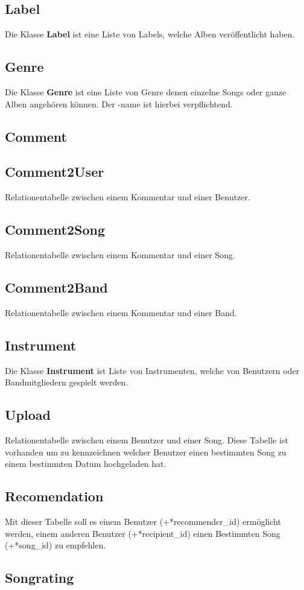 \documentclass[11pt,a4paper,DIV=9]{scrartcl}
\begin{document}
  \subsection{Label}
    Die Klasse \textbf{Label} ist eine Liste von Labels, welche Alben veröffentlicht haben.
  \subsection{Genre}
    Die Klasse \textbf{Genre} ist eine Liste von Genre denen einzelne Songs oder ganze Alben angehören können. Der -name ist hierbei verpflichtend.
  \subsection{Comment}
  \subsection{Comment2User}
    Relationentabelle zwischen einem Kommentar und einer Benutzer.
  \subsection{Comment2Song}
    Relationentabelle zwischen einem Kommentar und einer Song.
  \subsection{Comment2Band}
    Relationentabelle zwischen einem Kommentar und einer Band.
  \subsection{Instrument}
    Die Klasse \textbf{Instrument} ist Liste von Instrumenten, welche von Benutzern oder Bandmitgliedern gespielt werden.
  \subsection{Upload}
    Relationentabelle zwischen einem Benutzer und einer Song. Diese Tabelle ist vorhanden um zu kennzeichnen welcher Benutzer einen bestimmten Song zu einem bestimmten Datum hochgeladen hat.
  \subsection{Recomendation}
    Mit dieser Tabelle soll es einem Benutzer (+*recommender\_id) ermöglicht werden, einem anderen Benutzer (+*recipient\_id) einen Bestimmten Song (+*song\_id) zu empfehlen.
  \subsection{Songrating}
\end{document}
